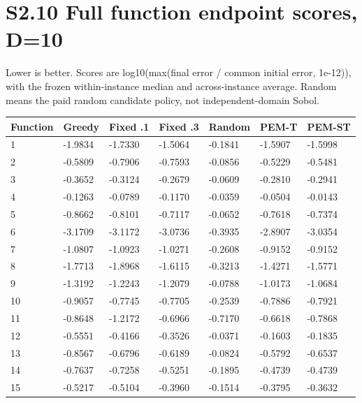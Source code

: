 \documentclass[11pt,a4paper]{article}
\begin{document}
\newpage

\hypertarget{s2.10-full-function-endpoint-scores-d10}{%
\section{S2.10 Full function endpoint scores,
D=10}\label{s2.10-full-function-endpoint-scores-d10}}

Lower is better. Scores are log10(max(final error / common initial
error, 1e-12)), with the frozen within-instance median and
across-instance average. Random means the paid random candidate policy,
not independent-domain Sobol.

\par\noindent\begin{minipage}{\linewidth}

\begin{longtable}[]{@{}lllllll@{}}
\toprule
Function & Greedy & Fixed .1 & Fixed .3 & Random & PEM-T & PEM-ST \\
\midrule
\endhead
1 & -1.9834 & -1.7330 & -1.5064 & -0.1841 & -1.5907 & -1.5998 \\
2 & -0.5809 & -0.7906 & -0.7593 & -0.0856 & -0.5229 & -0.5481 \\
3 & -0.3652 & -0.3124 & -0.2679 & -0.0609 & -0.2810 & -0.2941 \\
4 & -0.1263 & -0.0789 & -0.1170 & -0.0359 & -0.0504 & -0.0143 \\
5 & -0.8662 & -0.8101 & -0.7117 & -0.0652 & -0.7618 & -0.7374 \\
6 & -3.1709 & -3.1172 & -3.0736 & -0.3935 & -2.8907 & -3.0354 \\
7 & -1.0807 & -1.0923 & -1.0271 & -0.2608 & -0.9152 & -0.9152 \\
8 & -1.7713 & -1.8968 & -1.6115 & -0.3213 & -1.4271 & -1.5771 \\
9 & -1.3192 & -1.2243 & -1.2079 & -0.0788 & -1.0173 & -1.0684 \\
10 & -0.9057 & -0.7745 & -0.7705 & -0.2539 & -0.7886 & -0.7921 \\
11 & -0.8648 & -1.2172 & -0.6966 & -0.7170 & -0.6618 & -0.7868 \\
12 & -0.5551 & -0.4166 & -0.3526 & -0.0371 & -0.1603 & -0.1835 \\
13 & -0.8567 & -0.6796 & -0.6189 & -0.0824 & -0.5792 & -0.6537 \\
14 & -0.7637 & -0.7258 & -0.5251 & -0.1895 & -0.4739 & -0.4739 \\
15 & -0.5217 & -0.5104 & -0.3960 & -0.1514 & -0.3795 & -0.3632 \\

\end{longtable}
\end{minipage}
\end{document}
